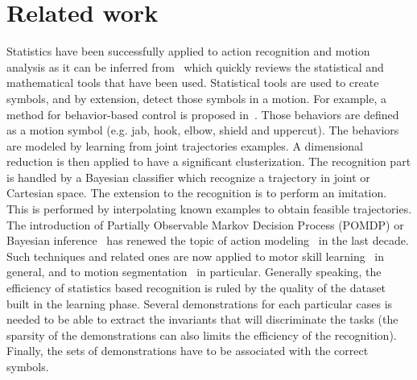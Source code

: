 \documentclass[letterpaper, 10pt, conference]{ieeeconf}      %
\begin{document}
\section{Related work}
Statistics have been successfully applied
to action recognition and motion analysis as it can be inferred 
from~\cite{schaal03} which quickly reviews the statistical and mathematical 
tools that have been used. 
Statistical tools are used to create symbols, and by extension, detect those
symbols in a motion. For example, a method for behavior-based control 
is proposed in~\cite{drumwright03, drumwright04}. Those behaviors are defined 
as a motion symbol (e.g. jab, hook, elbow, shield and uppercut). 
The behaviors are modeled by learning from joint trajectories examples.
A dimensional reduction is then applied to have a significant
clusterization.  The recognition part is handled by a Bayesian classifier which
recognize a trajectory in joint or Cartesian space. The extension to the recognition
is to perform an imitation. This is performed by interpolating known examples to obtain feasible trajectories.  
The introduction of Partially
Observable Markov Decision Process (POMDP) or Bayesian inference~\cite{pearl88} has
renewed the topic of action modeling~\cite{kaelbling98} in the last decade. Such
techniques and related ones are now applied to motor skill learning~\cite{peters08} in
general, and to motion segmentation~\cite{calinon10, inamura04} in particular. 
Generally speaking, the efficiency of statistics based recognition is ruled by the quality of the dataset built
in the learning phase.
Several demonstrations for each particular cases is needed to be able to extract
the invariants that will discriminate the tasks (the sparsity of the demonstrations
can also limits the efficiency of the recognition). Finally, the sets of demonstrations
have to be associated with the correct symbols.
\end{document}
